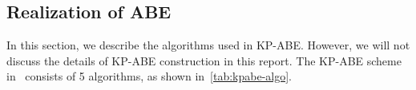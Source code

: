 \documentclass[hyp,a4paper,12pt,openbib]{socreport}
\begin{document}


\subsection{Realization of ABE}
In this section, we describe the algorithms used in KP-ABE. However, we will not discuss the details of KP-ABE construction in this report. The KP-ABE scheme in~\cite{lewko2010revocation} consists of 5 algorithms, as shown in~\cref{tab:kpabe-algo}.

\end{document}

